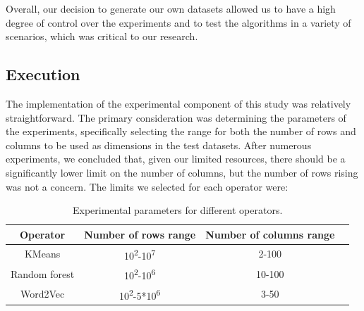 \documentclass[conference]{IEEEtran}
\begin{document}
\par
Overall, our decision to generate our own datasets allowed us to have a high degree of control over the experiments and to test the algorithms in a variety of scenarios, which was critical to our research.


\subsection{Execution}
The implementation of the experimental component of this study was relatively straightforward. The primary consideration was determining the parameters of the experiments, specifically selecting the range for both the number of rows and columns to be used as dimensions in the test datasets. After numerous experiments, we concluded that, given our limited resources, there should be a significantly lower limit on the number of columns, but the number of rows rising was not a concern. 
The limits we selected for each operator were:

\begin{table}[h!]
\centering
\begin{tabular}{|c|c|c|c|}
\hline
\textbf{Operator} & \textbf{Number of rows range} & \textbf{Number of columns range} \\ \hline
KMeans & 10\textsuperscript{2}-10\textsuperscript{7} & 2-100 \\ \hline
Random forest & 10\textsuperscript{2}-10\textsuperscript{6} & 10-100 \\ \hline
Word2Vec & 10\textsuperscript{2}-5*10\textsuperscript{6} & 3-50 \\ \hline
\end{tabular}
\caption{Experimental parameters for different operators.}
\label{table:experimental_parameters}
\end{table}
\end{document}
